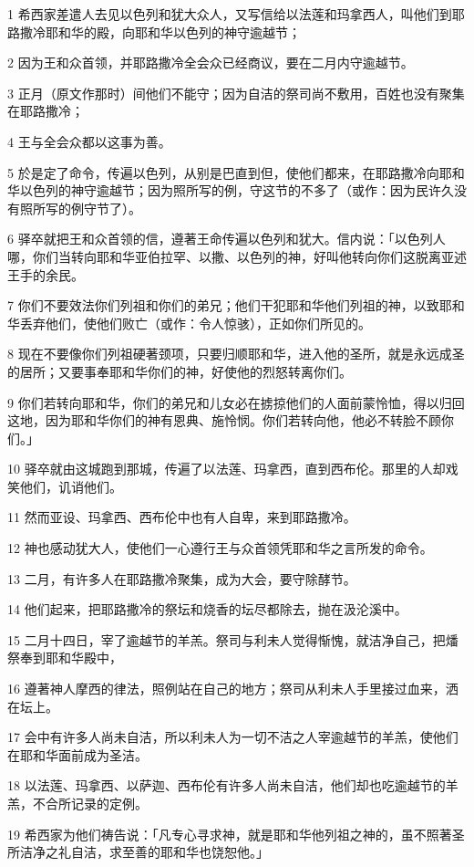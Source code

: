 \par 1 希西家差遣人去见以色列和犹大众人，又写信给以法莲和玛拿西人，叫他们到耶路撒冷耶和华的殿，向耶和华以色列的神守逾越节；
\par 2 因为王和众首领，并耶路撒冷全会众已经商议，要在二月内守逾越节。
\par 3 正月（原文作那时）间他们不能守；因为自洁的祭司尚不敷用，百姓也没有聚集在耶路撒冷；
\par 4 王与全会众都以这事为善。
\par 5 於是定了命令，传遍以色列，从别是巴直到但，使他们都来，在耶路撒冷向耶和华以色列的神守逾越节；因为照所写的例，守这节的不多了（或作：因为民许久没有照所写的例守节了）。
\par 6 驿卒就把王和众首领的信，遵著王命传遍以色列和犹大。信内说：「以色列人哪，你们当转向耶和华亚伯拉罕、以撒、以色列的神，好叫他转向你们这脱离亚述王手的余民。
\par 7 你们不要效法你们列祖和你们的弟兄；他们干犯耶和华他们列祖的神，以致耶和华丢弃他们，使他们败亡（或作：令人惊骇），正如你们所见的。
\par 8 现在不要像你们列祖硬著颈项，只要归顺耶和华，进入他的圣所，就是永远成圣的居所；又要事奉耶和华你们的神，好使他的烈怒转离你们。
\par 9 你们若转向耶和华，你们的弟兄和儿女必在掳掠他们的人面前蒙怜恤，得以归回这地，因为耶和华你们的神有恩典、施怜悯。你们若转向他，他必不转脸不顾你们。」
\par 10 驿卒就由这城跑到那城，传遍了以法莲、玛拿西，直到西布伦。那里的人却戏笑他们，讥诮他们。
\par 11 然而亚设、玛拿西、西布伦中也有人自卑，来到耶路撒冷。
\par 12 神也感动犹大人，使他们一心遵行王与众首领凭耶和华之言所发的命令。
\par 13 二月，有许多人在耶路撒冷聚集，成为大会，要守除酵节。
\par 14 他们起来，把耶路撒冷的祭坛和烧香的坛尽都除去，抛在汲沦溪中。
\par 15 二月十四日，宰了逾越节的羊羔。祭司与利未人觉得惭愧，就洁净自己，把燔祭奉到耶和华殿中，
\par 16 遵著神人摩西的律法，照例站在自己的地方；祭司从利未人手里接过血来，洒在坛上。
\par 17 会中有许多人尚未自洁，所以利未人为一切不洁之人宰逾越节的羊羔，使他们在耶和华面前成为圣洁。
\par 18 以法莲、玛拿西、以萨迦、西布伦有许多人尚未自洁，他们却也吃逾越节的羊羔，不合所记录的定例。
\par 19 希西家为他们祷告说：「凡专心寻求神，就是耶和华他列祖之神的，虽不照著圣所洁净之礼自洁，求至善的耶和华也饶恕他。」
